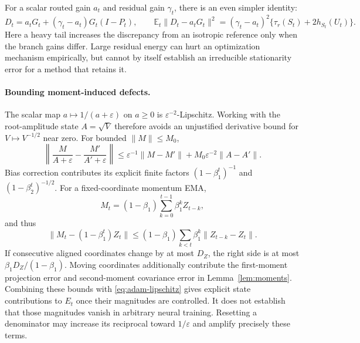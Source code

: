For a scalar routed gain $a_t$ and residual gain $\gamma_t$, there is an
even simpler identity:
\begin{equation}
 D_t=a_tG_t+(\gamma_t-a_t)G_t(I-P_t),\qquad
 \mathbb E_t\|D_t-a_tG_t\|^2
 =(\gamma_t-a_t)^2\{\tau_r(S_t)+2h_{S_t}(U_t)\}.
 \label{eq:tail-gain}
\end{equation}
Here a heavy tail increases the discrepancy from an isotropic reference
only when the branch gains differ. Large residual energy can hurt an
optimization mechanism empirically, but cannot by itself establish an
irreducible stationarity error for a method that retains it.

\paragraph{Bounding moment-induced defects.}
The scalar map $a\mapsto1/(a+\varepsilon)$ on $a\ge0$ is
$\varepsilon^{-2}$-Lipschitz. Working with the root-amplitude state
$A=\sqrt V$ therefore avoids an unjustified derivative bound for
$V\mapsto V^{-1/2}$ near zero. For bounded $\|M\|\le M_0$,
\begin{equation}
 \left\|\frac{M}{A+\varepsilon}-
              \frac{M'}{A'+\varepsilon}\right\|
 \le\varepsilon^{-1}\|M-M'\|
        +M_0\varepsilon^{-2}\|A-A'\|.\label{eq:adam-lipschitz}
\end{equation}
Bias correction contributes its explicit finite factors
$(1-\beta_1^t)^{-1}$ and $(1-\beta_2^t)^{-1/2}$.
For a fixed-coordinate momentum EMA,
\begin{equation}
 M_t=(1-\beta_1)\sum_{k=0}^{t-1}\beta_1^k Z_{t-k},
\end{equation}
and thus
\begin{equation}
 \|M_t-(1-\beta_1^t)Z_t\|
 \le(1-\beta_1)\sum_{k<t}\beta_1^k\|Z_{t-k}-Z_t\|.
\end{equation}
If consecutive aligned coordinates change by at most $D_Z$, the
right side is at most $\beta_1D_Z/(1-\beta_1)$.
Moving coordinates additionally contribute the first-moment projection
error and second-moment covariance error in Lemma~\ref{lem:moments}.
Combining these bounds with \eqref{eq:adam-lipschitz} gives explicit
state contributions to $E_t$ once their magnitudes are controlled.
It does not establish that those magnitudes vanish in arbitrary neural
training. Resetting a denominator may increase its reciprocal toward
$1/\varepsilon$ and amplify precisely these terms.

